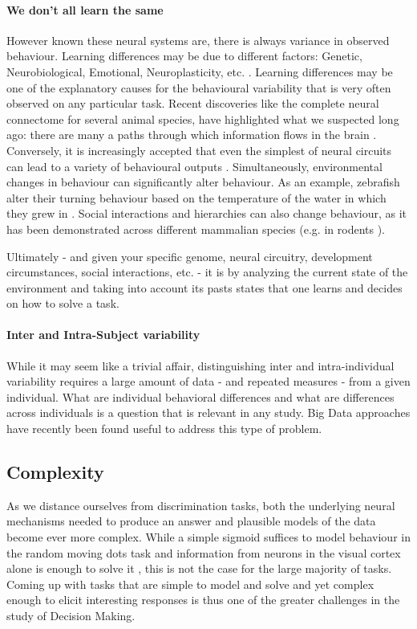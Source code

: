 \documentclass[11pt]{article}
\begin{document}
\paragraph{We don’t all learn the same}
However known these neural systems are, there is always variance in observed behaviour. Learning differences may be due to different factors: Genetic, Neurobiological, Emotional, Neuroplasticity, etc. \cite{zatorre2012plasticity} \cite{ericsson1993role}. Learning differences may be one of the explanatory causes for the behavioural variability that is very often observed on any particular task.
Recent discoveries like the complete neural connectome for several animal species, have highlighted what we suspected long ago: there are many a paths through which information flows in the brain \cite{asahina2022editorial}. Conversely, it is increasingly accepted that even the simplest of neural circuits can lead to a variety of behavioural outputs \cite{cruz2022action}.
Simultaneously, environmental changes in behaviour can significantly alter behaviour. As an example, zebrafish alter their turning behaviour based on the temperature of the water in which they grew in \cite{hageter2021environmental}. Social interactions and hierarchies can also change behaviour, as it has been demonstrated across different mammalian species (e.g. in rodents \cite{faure2022social}).

Ultimately - and given your specific genome, neural circuitry, development circumstances, social interactions, etc. - it is by analyzing the current state of the environment and taking into account its pasts states that one learns and decides on how to solve a task.

\paragraph{Inter and Intra-Subject variability}
While it may seem like a trivial affair, distinguishing inter and intra-individual variability requires a large amount of data - and repeated measures - from a given individual. What are individual behavioral differences and what are differences across individuals is a question that is relevant in any study. Big Data approaches have recently been found useful to address this type of problem.

\subsection{Complexity}
As we distance ourselves from discrimination tasks, both the underlying neural mechanisms needed to produce an answer and plausible models of the data become ever more complex. While a simple sigmoid suffices to model behaviour in the random moving dots task and information from neurons in the visual cortex alone is enough to solve it \cite{newsome1989neuronal}, this is not the case for the large majority of tasks. Coming up with tasks that are simple to model and solve and yet complex enough to elicit interesting responses is thus one of the greater challenges in the study of Decision Making.
\end{document}
